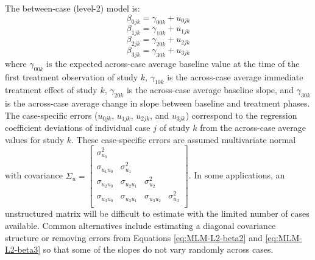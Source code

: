 \documentclass[
]{book}
\begin{document}
The between-case (level-2) model is:
\begin{equation}
\label{eq:MLM-L2-beta0}
\beta_{0jk} = \gamma_{00k} + u_{0jk}
\end{equation}
\begin{equation}
\label{eq:MLM-L2-beta1}
\beta_{1jk} = \gamma_{10k} + u_{1jk}
\end{equation}
\begin{equation}
\label{eq:MLM-L2-beta2}
\beta_{2jk} = \gamma_{20k} + u_{2jk}
\end{equation}
\begin{equation}
\label{eq:MLM-L2-beta3}
\beta_{3jk} = \gamma_{30k} + u_{3jk}
\end{equation}
where \(\gamma_{00k}\) is the expected across-case average baseline value at the time of the first treatment observation of study \(k\), \(\gamma_{10k}\) is the across-case average immediate treatment effect of study \(k\), \(\gamma_{20k}\) is the across-case average baseline slope, and \(\gamma_{30k}\) is the across-case average change in slope between baseline and treatment phases. The case-specific errors (\(u_{0jk}\), \(u_{1jk}\), \(u_{2jk}\), and \(u_{3jk}\)) correspond to the regression coefficient deviations of individual case \(j\) of study \(k\) from the across-case average values for study \(k\). These case-specific errors are assumed multivariate normal with covariance
\(\Sigma_u = \begin{bmatrix} \sigma_{u_0}^2 & & & \\ \sigma_{u_1u_0} & \sigma_{u_1}^2 & & \\ \sigma_{u_2u_0} & \sigma_{u_2u_1} & \sigma_{u_2}^2 & \\ \sigma_{u_3u_0} & \sigma_{u_3u_1} & \sigma_{u_3u_2} & \sigma_{u_3}^2\\ \end{bmatrix}\).
In some applications, an unstructured matrix will be difficult to estimate with the limited number of cases available. Common alternatives include estimating a diagonal covariance structure or removing errors from Equations \eqref{eq:MLM-L2-beta2} and \eqref{eq:MLM-L2-beta3} so that some of the slopes do not vary randomly across cases.
\end{document}
